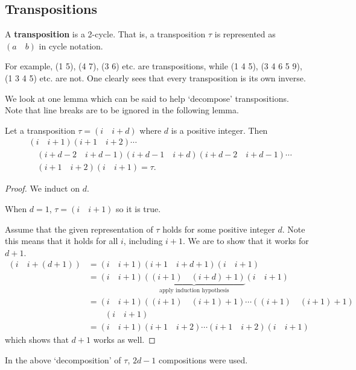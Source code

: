 \subsection{Transpositions}
\begin{definition}
    A \textbf{transposition} is a 2-cycle. That is, a transposition $\tau$ is represented as $(a\quad b)$ in cycle notation.
\end{definition}
For example, (1 5), (4 7), (3 6) etc. are transpositions, while (1 4 5), (3 4 6 5 9), (1 3 4 5) etc. are not. One clearly sees that every transposition is its own inverse.

We look at one lemma which can be said to help `decompose' transpositions. Note that line breaks are to be ignored in the following lemma.
\begin{lemma}\label{lemma-decompose-transposition}
    Let a transposition $\tau = (i\quad i+d)$ where $d$ is a positive integer. Then
    \begin{align*}
        & (i\quad i+1)(i+1\quad i+2)\cdots\\
        &\quad (i+d-2\quad i+d-1)(i+d-1\quad i+d)(i+d-2\quad i+d-1)\cdots\\
        &\quad (i+1\quad i+2)(i\quad i+1) = \tau.
    \end{align*}
\end{lemma}
\begin{proof}
    We induct on $d$.

    When $d = 1$, $\tau = (i\quad i+1)$ so it is true.

    Assume that the given representation of $\tau$ holds for some positive integer $d$. Note this means that it holds for all $i$, including $i+1$. We are to show that it works for $d + 1$.
    \begin{align*}
        (i\quad i+(d+1)) &= (i\quad i+1)(i+1\quad i+d+1)(i\quad i+1)\\
        &= (i\quad i+1)\underbrace{((i+1)\quad (i+d)+1)}_{\text{apply induction hypothesis}}(i\quad i+1)\\
        &= (i\quad i+1)((i+1)\quad(i+1)+1)\cdots((i+1)\quad(i+1)+1)\\
        &\quad\quad(i\quad i+1)\\
        &= (i\quad i+1)(i+1\quad i+2)\cdots(i+1\quad i+2)(i\quad i+1)
    \end{align*}
    which shows that $d+1$ works as well.
\end{proof}
\begin{remark}
    In the above `decomposition' of $\tau$, $2d-1$ compositions were used.
\end{remark}
